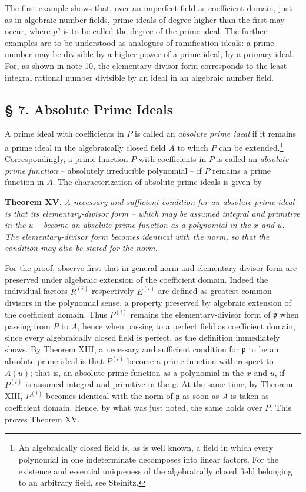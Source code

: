 \documentclass[11pt]{article}
\providecommand{\frakp}{\mathfrak p}
\begin{document}
The first example shows that, over an imperfect field as coefficient domain, just as in algebraic number fields, prime ideals of degree higher than the first may occur, where $p^g$ is to be called the degree of the prime ideal. The further examples are to be understood as analogues of ramification ideals: a prime number may be divisible by a higher power of a prime ideal, by a primary ideal. For, as shown in note 10, the elementary-divisor form corresponds to the least integral rational number divisible by an ideal in an algebraic number field.

\subsection*{§ 7. Absolute Prime Ideals}

A prime ideal with coefficients in $P$ is called an \emph{absolute prime ideal} if it remains a prime ideal in the algebraically closed field $A$ to which $P$ can be extended.\footnote{An algebraically closed field is, as is well known, a field in which every polynomial in one indeterminate decomposes into linear factors. For the existence and essential uniqueness of the algebraically closed field belonging to an arbitrary field, see Steinitz.} Correspondingly, a prime function $P$ with coefficients in $P$ is called an \emph{absolute prime function} -- absolutely irreducible polynomial -- if $P$ remains a prime function in $A$. The characterization of absolute prime ideals is given by

\textbf{Theorem XV.} \emph{A necessary and sufficient condition for an absolute prime ideal is that its elementary-divisor form -- which may be assumed integral and primitive in the $u$ -- become an absolute prime function as a polynomial in the $x$ and $u$. The elementary-divisor form becomes identical with the norm, so that the condition may also be stated for the norm.}

For the proof, observe first that in general norm and elementary-divisor form are preserved under algebraic extension of the coefficient domain. Indeed the individual factors $R^{(i)}$ respectively $E^{(i)}$ are defined as greatest common divisors in the polynomial sense, a property preserved by algebraic extension of the coefficient domain. Thus $P^{(i)}$ remains the elementary-divisor form of $\frakp$ when passing from $P$ to $A$, hence when passing to a perfect field as coefficient domain, since every algebraically closed field is perfect, as the definition immediately shows. By Theorem XIII, a necessary and sufficient condition for $\frakp$ to be an absolute prime ideal is that $P^{(i)}$ become a prime function with respect to $A(u)$; that is, an absolute prime function as a polynomial in the $x$ and $u$, if $P^{(i)}$ is assumed integral and primitive in the $u$. At the same time, by Theorem XIII, $P^{(i)}$ becomes identical with the norm of $\frakp$ as soon as $A$ is taken as coefficient domain. Hence, by what was just noted, the same holds over $P$. This proves Theorem XV.
\end{document}
